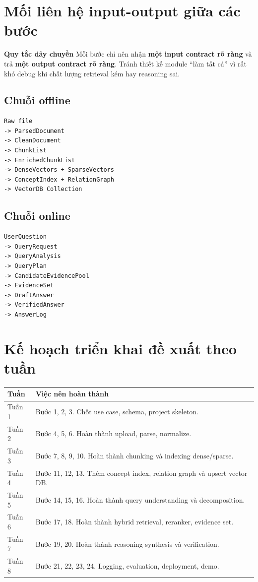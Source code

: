 \documentclass[12pt,a4paper]{article}
\begin{document}
\section{Mối liên hệ input-output giữa các bước}

\begin{overviewbox}
\textbf{Quy tắc dây chuyền}\newline
Mỗi bước chỉ nên nhận \textbf{một input contract rõ ràng} và trả \textbf{một output contract rõ ràng}. Tránh thiết kế module ``làm tất cả'' vì rất khó debug khi chất lượng retrieval kém hay reasoning sai.
\end{overviewbox}

\subsection{Chuỗi offline}
\begin{lstlisting}
Raw file
-> ParsedDocument
-> CleanDocument
-> ChunkList
-> EnrichedChunkList
-> DenseVectors + SparseVectors
-> ConceptIndex + RelationGraph
-> VectorDB Collection
\end{lstlisting}

\subsection{Chuỗi online}
\begin{lstlisting}
UserQuestion
-> QueryRequest
-> QueryAnalysis
-> QueryPlan
-> CandidateEvidencePool
-> EvidenceSet
-> DraftAnswer
-> VerifiedAnswer
-> AnswerLog
\end{lstlisting}

\section{Kế hoạch triển khai đề xuất theo tuần}

\begin{longtable}{p{}p{}}
\toprule
\textbf{Tuần} & \textbf{Việc nên hoàn thành} \\
\midrule
\endhead
Tuần 1 & Bước 1, 2, 3. Chốt use case, schema, project skeleton. \\
Tuần 2 & Bước 4, 5, 6. Hoàn thành upload, parse, normalize. \\
Tuần 3 & Bước 7, 8, 9, 10. Hoàn thành chunking và indexing dense/sparse. \\
Tuần 4 & Bước 11, 12, 13. Thêm concept index, relation graph và upsert vector DB. \\
Tuần 5 & Bước 14, 15, 16. Hoàn thành query understanding và decomposition. \\
Tuần 6 & Bước 17, 18. Hoàn thành hybrid retrieval, reranker, evidence set. \\
Tuần 7 & Bước 19, 20. Hoàn thành reasoning synthesis và verification. \\
Tuần 8 & Bước 21, 22, 23, 24. Logging, evaluation, deployment, demo. \\
\bottomrule
\end{longtable}
\end{document}
